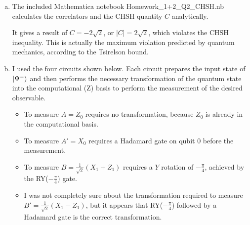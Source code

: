 \documentclass[12pt]{extarticle}
\begin{document}
\begin{enumerate}[(a)]
\item
The included Mathematica notebook Homework\_1+2\_Q2\_CHSH.nb calculates the correlators and the CHSH quantity $C$ analytically.

It gives a result of $C = -2\sqrt{2}$, or $|C| = 2\sqrt{2}$, which violates the CHSH inequality.
This is actually the maximum violation predicted by quantum mechanics, according to the Tsirelson bound.

\item
I used the four circuits shown below.
Each circuit prepares the input state of $\ket{\Psi^{-}}$ and then performs the necessary transformation of the quantum state into the computational (Z) basis to perform the measurement of the desired observable.

\begin{itemize}
\item To measure $A=Z_0$ requires no transformation, because $Z_0$ is already in the computational basis.
\item To measure $A'=X_0$ requires a Hadamard gate on qubit 0 before the measurement.
\item To measure $B=\frac{1}{\sqrt{2}}(X_1 + Z_1)$ requires a $Y$ rotation of $-\frac{\pi}{4}$, achieved by the RY($-\frac{\pi}{4}$) gate.
\item I was not completely sure about the transformation required to measure $B'=\frac{1}{\sqrt{2}}(X_1 - Z_1)$, but it appears that
RY($-\frac{\pi}{4}$) followed by a Hadamard gate is the correct transformation.
\end{itemize}


\end{enumerate}
\end{document}
